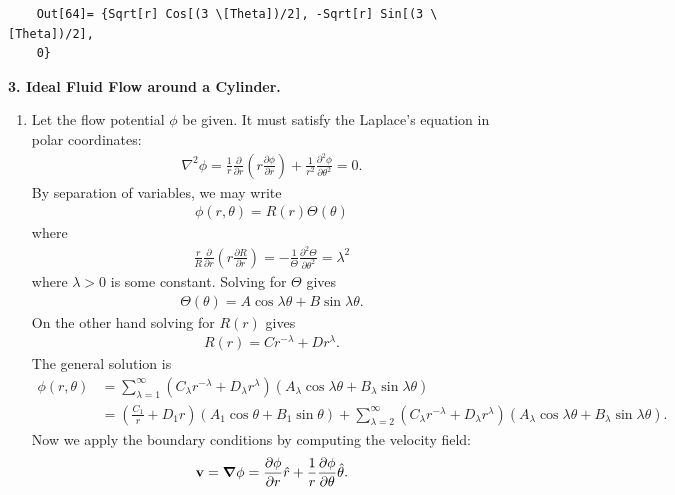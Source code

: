 \documentclass{article}
\theoremstyle{definition}
\newcommand{\p}{\partial}
\newcommand{\f}[2]{\frac{#1}{#2}}
\newcommand{\lp}{\left(}
\newcommand{\rp}{\right)}
\begin{document}
\begin{enumerate}[label=(\alph*)]
\begin{lstlisting}
	Out[64]= {Sqrt[r] Cos[(3 \[Theta])/2], -Sqrt[r] Sin[(3 \[Theta])/2],
	0}
	\end{lstlisting}
	
	
	

 
\end{enumerate}

\newpage


\noindent \textbf{3. Ideal Fluid Flow around a Cylinder.} 

\begin{enumerate}[label=(\alph*)]
	\item Let the flow potential $\phi$ be given. It must satisfy the Laplace's equation in polar coordinates:
	\begin{align*}
	\nabla^2 \phi = \f{1}{r}\f{\p}{\p r}\lp r\f{\p \phi}{\p r} \rp + \f{1}{r^2}\f{\p^2 \phi}{\p \theta^2} = 0. 
	\end{align*}
	By separation of variables, we may write
	\begin{align*}
	\phi(r,\theta) = R(r)\Theta(\theta)
	\end{align*}
	where
	\begin{align*}
 	\f{r}{R}\f{\p}{\p r}\lp r\f{\p R}{\p r} \rp = -\f{1}{\Theta}\f{\p^2 \Theta}{\p \theta^2} = \lambda^2
	\end{align*}
	where $\lambda > 0$ is some constant. Solving for $\Theta$ gives
	\begin{align*}
	\Theta(\theta) = A\cos \lambda \theta + B \sin\lambda \theta.
	\end{align*}
	On the other hand solving for $R(r)$ gives
	\begin{align*}
	R(r) = Cr^{-\lambda} + D r^{\lambda}.
	\end{align*}
	The general solution is 
	\begin{align*}
	\phi(r,\theta) &= \sum_{\lambda = 1}^\infty (C_\lambda r^{-\lambda} + D_\lambda r^{\lambda}) (A_\lambda\cos\lambda\theta + B_\lambda\sin\lambda\theta) \\ 
	&= \lp \f{C_1}{r} + D_1r \rp(A_1 \cos\theta + B_1 \sin\theta) + \sum_{\lambda = 2}^\infty (C_\lambda r^{-\lambda} + D_\lambda r^{\lambda}) (A_\lambda\cos\lambda\theta + B_\lambda\sin\lambda\theta).
	\end{align*}
	Now we apply the boundary conditions by computing the velocity field:
	\begin{align*}
	\mathbf{v} = \grad \phi = \f{\p \phi}{\p r} \hat{r} + \f{1}{r}\f{\p \phi}{\p \theta} \hat{\theta}.
	\end{align*}

\end{enumerate}
\end{document}
